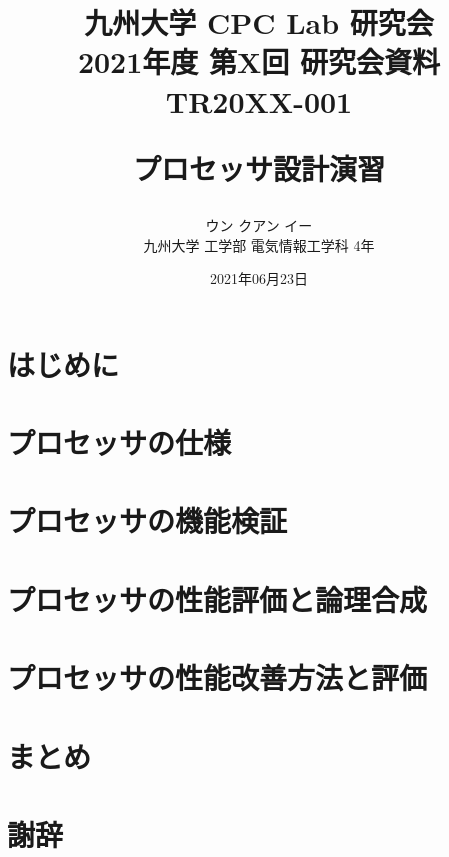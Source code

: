 \documentclass[a4paper, 10pt]{jarticle}
\title{
  \begin{flushright}
    \normalsize{
      九州大学 CPC Lab 研究会  \\
      2021年度 第X回 研究会資料 TR20XX-001
    }
  \end{flushright}
  \Large{\textbf{プロセッサ設計演習}}
}
\author{
    ウン クアン イー\\
    九州大学 工学部 電気情報工学科 4年
}
\date{2021年06月23日}
\begin{document}
  \begin{twocolumn}

  \maketitle

  \section{はじめに}
  

  \section{プロセッサの仕様}
  

  \section{プロセッサの機能検証}
  

  \section{プロセッサの性能評価と論理合成}
  

  \section{プロセッサの性能改善方法と評価}
  

  \section{まとめ}
  

  \section*{謝辞}
  

  \cite{ca-quantitative-approach}

  
  

\end{twocolumn}
\end{document}
